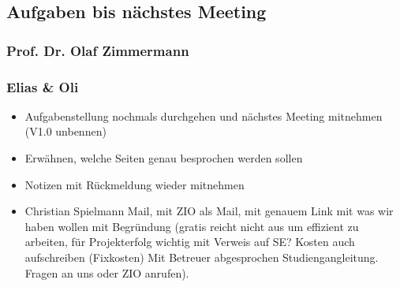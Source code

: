 \hypertarget{aufgaben-bis-nachstes-meeting}{%
\subsection*{Aufgaben bis nächstes
Meeting}\label{aufgaben-bis-nachstes-meeting}}

\hypertarget{prof.-dr.-olaf-zimmermann}{%
\subsubsection*{Prof. Dr. Olaf
Zimmermann}\label{prof.-dr.-olaf-zimmermann}}

\hypertarget{elias-ux5cux26-oli}{%
\subsubsection*{Elias \& Oli}\label{elias-ux5cux26-oli}}

\begin{itemize}

\item
  Aufgabenstellung nochmals durchgehen und nächstes Meeting mitnehmen
  (V1.0 unbennen)
\item
  Erwähnen, welche Seiten genau besprochen werden sollen
\item
  Notizen mit Rückmeldung wieder mitnehmen
\item
  Christian Spielmann Mail, mit ZIO als Mail, mit genauem Link mit was
  wir haben wollen mit Begründung (gratis reicht nicht aus um effizient
  zu arbeiten, für Projekterfolg wichtig mit Verweis auf SE? Kosten auch
  aufschreiben (Fixkosten) Mit Betreuer abgesprochen Studiengangleitung.
  Fragen an uns oder ZIO anrufen).
\end{itemize}